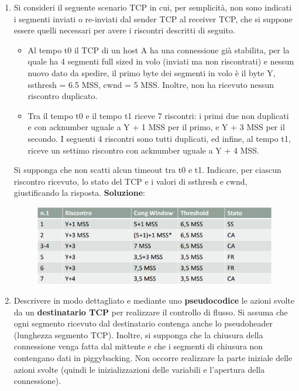 \documentclass[11pt,a4paper]{article}
\theoremstyle{definition}
\begin{document}
\begin{enumerate}
\begin{figure}[!h]
		      \centering
	      \end{figure}
	\item Si consideri il seguente scenario TCP in cui, per semplicità, non sono
	      indicati i segmenti inviati o re-inviati dal sender TCP al receiver TCP, che si
	      suppone essere quelli necessari per avere i riscontri descritti di seguito.
	      \begin{itemize}
		      \item Al tempo t0 il TCP di un host A ha una connessione già stabilita, per la
		            quale ha 4 segmenti full sized in volo (inviati ma non riscontrati) e nessun
		            nuovo dato da spedire, il primo byte dei segmenti in volo è il byte Y,
		            ssthresh = 6.5 MSS, cwnd = 5 MSS. Inoltre, non ha ricevuto nessun riscontro
		            duplicato.
		      \item Tra il tempo t0 e il tempo t1 riceve 7 riscontri: i primi due non duplicati e
		            con acknumber uguale a Y + 1 MSS per il primo, e Y + 3 MSS per il secondo. I
		            seguenti 4 riscontri sono tutti duplicati, ed infine, al tempo t1, riceve un
		            settimo riscontro con acknumber uguale a Y + 4 MSS.
	      \end{itemize}
	      Si supponga che non scatti alcun timeout tra t0 e t1. Indicare, per ciascun riscontro ricevuto, lo stato del TCP e i valori di ssthresh e cwnd, giustificando la risposta.
	      \newpage
	      \textbf{Soluzione}:
	      \begin{figure}[!h]
		      \includegraphics[scale=0.5]{Immagini/Es6.png}
		      \centering
	      \end{figure}
	\item Descrivere in modo dettagliato e mediante uno \textbf{pseudocodice} le azioni svolte da un \textbf{destinatario TCP} per realizzare il controllo di flusso. Si assuma che ogni segmento ricevuto dal destinatario contenga anche lo pseudoheader (lunghezza segmento TCP). Inoltre, si supponga che la chiusura della connessione venga
	      fatta dal mittente e che i segmenti di chiusura non contengano dati in piggybacking. Non occorre realizzare la parte iniziale delle azioni svolte (quindi le inizializzazioni delle variabili e l’apertura della connessione).

\end{enumerate}
\end{document}
